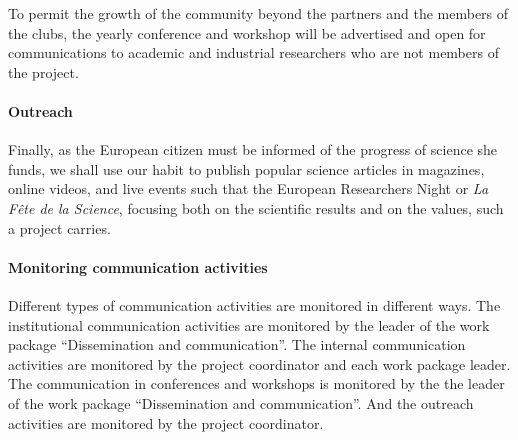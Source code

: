 To permit the growth of the community beyond the partners and the
members of the clubs, the yearly conference and workshop will be
advertised and open for communications to academic and industrial
researchers who are not members of the project.

\paragraph*{Outreach}

Finally, as the European citizen must be informed of the progress of
science she funds, we shall use our habit to publish popular science
articles in magazines, online videos, and live events such that the
European Researchers Night or {\em La Fête de la Science}, focusing
both on the scientific results and on the values, such a project
carries.

\paragraph*{Monitoring communication activities}

Different types of communication activities are monitored in
different ways.  The institutional communication activities are
monitored by the leader of the work package ``Dissemination and
communication''. The internal communication activities are monitored
by the project coordinator and each work package leader. The communication
in conferences and workshops is monitored by the
the leader of the work package ``Dissemination and
communication''. And the outreach activities are monitored by the
project coordinator.

